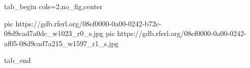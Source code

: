  
 
 
 
 


\ifcmt
  tab_begin cols=2,no_fig,center

     pic https://gdb.rferl.org/08ef0000-0a00-0242-b72c-08d9cad7a0dc_w1023_r0_s.jpg
		 pic https://gdb.rferl.org/08ef0000-0a00-0242-af05-08d9cad7a215_w1597_r1_s.jpg

  tab_end
\fi
